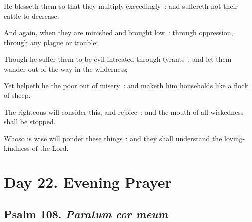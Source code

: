 He blesseth them so that they multiply exceedingly~: and suffereth not their cattle to decrease.\par
{}And again, when they are minished and brought low~: through oppression, through any plague or trouble;\par
{}Though he suffer them to be evil intreated through tyrants~: and let them wander out of the way in the wilderness;\par
{}Yet helpeth he the poor out of misery~: and maketh him households like a flock of sheep.\par
{}The righteous will consider this, and rejoice~: and the mouth of all wickedness shall be stopped.\par
{}Whoso is wise will ponder these things~: and they shall understand the loving-kindness of the Lord.\par


\section*{Day 22. Evening Prayer}

\subsection{Psalm 108. \textit{Paratum cor meum}}



